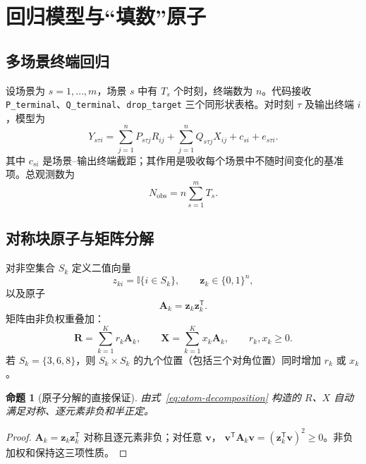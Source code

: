 \documentclass[UTF8,11pt]{ctexart}
\newtheorem{proposition}{命题}
\newcommand{\Rmat}{\bm R}
\newcommand{\Xmat}{\bm X}
\newcommand{\zv}{\bm z}
\newcommand{\ind}{\mathbb I}
\begin{document}
\section{回归模型与“填数”原子}

\subsection{多场景终端回归}

设场景为 $s=1,\ldots,m$，场景 $s$ 中有 $T_s$ 个时刻，终端数为 $n$。代码接收
\texttt{P\_terminal}、\texttt{Q\_terminal}、\texttt{drop\_target} 三个同形状表格。对时刻 $\tau$
及输出终端 $i$，模型为
\begin{equation}
  Y_{s\tau i}
  = \sum_{j=1}^{n}P_{s\tau j}R_{ij}
  + \sum_{j=1}^{n}Q_{s\tau j}X_{ij}
  + c_{si} + e_{s\tau i}.
  \label{eq:regression}
\end{equation}
其中 $c_{si}$ 是场景--输出终端截距；其作用是吸收每个场景中不随时间变化的基准项。总观测数为
\begin{equation}
  N_{\mathrm{obs}}=n\sum_{s=1}^{m}T_s.
\end{equation}

\subsection{对称块原子与矩阵分解}

对非空集合 $S_k$ 定义二值向量
\begin{equation}
 z_{ki}=\ind\{i\in S_k\},\qquad \zv_k\in\{0,1\}^{n},
\end{equation}
以及原子
\begin{equation}
 \bm A_k=\zv_k\zv_k^{\mathsf T}.
\end{equation}
矩阵由非负权重叠加：
\begin{equation}
 \Rmat=\sum_{k=1}^{K}r_k\bm A_k,
 \qquad
 \Xmat=\sum_{k=1}^{K}x_k\bm A_k,
 \qquad r_k,x_k\ge 0.
 \label{eq:atom-decomposition}
\end{equation}
若 $S_k=\{3,6,8\}$，则 $S_k\times S_k$ 的九个位置（包括三个对角位置）同时增加 $r_k$ 或 $x_k$。

\begin{proposition}[原子分解的直接保证]
由式~\eqref{eq:atom-decomposition} 构造的 $R$、$X$ 自动满足对称、逐元素非负和半正定。
\end{proposition}
\begin{proof}
$\bm A_k=\zv_k\zv_k^{\mathsf T}$ 对称且逐元素非负；对任意 $\bm v$，
$\bm v^{\mathsf T}\bm A_k\bm v=(\zv_k^{\mathsf T}\bm v)^2\ge0$。非负加权和保持这三项性质。
\end{proof}
\end{document}
